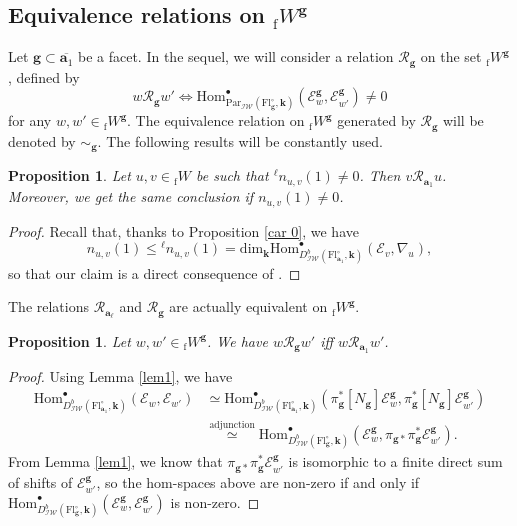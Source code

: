 \documentclass[11pt]{amsart}
\theoremstyle{plain}
\newtheorem{prop}[thm]{Proposition}
\theoremstyle{remark}
\numberwithin{equation}{section}
\begin{document}
	\subsection{Equivalence relations on ${_\mathrm{f}W}^\mathbf{g}$}
	Let $\mathbf{g}\subset\overline{\mathbf{a}_1}$ be a facet.  In the sequel, we will consider a relation $\mathscr{R}_{\mathbf{g}}$ on the set ${_\mathrm{f}W}^{\mathbf{g}}$, defined by 
	$$w\mathscr{R}_{\mathbf{g}}w'\Longleftrightarrow \mathrm{Hom}^\bullet_{\mathrm{Par}_{\mathcal{IW}}(\mathrm{Fl}^{\circ}_{\mathbf{g}},\mathbf{k})}(\mathcal{E}^{\mathbf{g}}_{w},\mathcal{E}^{\mathbf{g}}_{w'})\neq 0$$ 
	for any $w,w'\in {_\mathrm{f}W}^{\mathbf{g}}$. The equivalence relation on ${_\mathrm{f}W}^{\mathbf{g}}$ generated by $\mathscr{R}_{\mathbf{g}}$ will be denoted by $\sim_{\mathbf{g}}$. The following results will be constantly used.
	\begin{prop}\label{anti-spherical relations}
		Let $u,v\in{_\mathrm{f}W}$ be such that ${^\ell n}_{u,v}(1)\neq 0$. Then $v\mathscr{R}_{\mathbf{a}_1} u$. Moreover, we get the same conclusion if ${n}_{u,v}(1)\neq 0$.
	\end{prop}
	\begin{proof}
		Recall that, thanks to Proposition \ref{car 0}, we have
		$$n_{u,v}(1)\leq {^\ell n}_{u,v}(1)=\mathrm{dim}_\mathbf{k}\mathrm{Hom}_{D^b_{\mathcal{IW}}(\mathrm{Fl}^{\circ}_{\mathbf{a}_1},\mathbf{k})}^\bullet(\mathcal{E}_v,\nabla_{u}),$$
		so that our claim is a direct consequence of \cite[Proposition 2.6]{2014}.
	\end{proof}
	The relations $\mathscr{R}_{\mathbf{a}_\ell}$ and $\mathscr{R}_{\mathbf{g}}$ are actually equivalent on ${_\mathrm{f}W}^{\mathbf{g}}$.
	\begin{prop}\label{proj form}
		Let $w,w'\in {_\mathrm{f}W}^{\mathbf{g}}$. We have $w\mathscr{R}_{\mathbf{g}}w'$ iff $w\mathscr{R}_{\mathbf{a}_1}w'$.
	\end{prop}
	\begin{proof}
		Using Lemma \ref{lem1}, we have
		\begin{align*}
			\mathrm{Hom}_{D^b_{\mathcal{IW}}(\mathrm{Fl}^{\circ}_{\mathbf{a}_1},\mathbf{k})}^\bullet(\mathcal{E}_w,\mathcal{E}_{w'})&\simeq \mathrm{Hom}_{D^b_{\mathcal{IW}}(\mathrm{Fl}^{\circ}_{\mathbf{a}_1},\mathbf{k})}^\bullet(\pi^*_{\mathbf{g}}[N_\mathbf{g}]\mathcal{E}_w^{\mathbf{g}},\pi^*_{\mathbf{g}}[N_\mathbf{g}]\mathcal{E}_{w'}^{\mathbf{g}})\\
			&\overset{\text{adjunction}}{\simeq} \mathrm{Hom}_{D^b_{\mathcal{IW}}(\mathrm{Fl}^{\circ}_{\mathbf{g}},\mathbf{k})}^\bullet(\mathcal{E}_w^{\mathbf{g}},\pi_{\mathbf{g}*}\pi_{\mathbf{g}}^*\mathcal{E}_{w'}^{\mathbf{g}}).
		\end{align*}
		From Lemma \ref{lem1}, we know that $\pi_{\mathbf{g}*}\pi_{\mathbf{g}}^*\mathcal{E}_{w'}^{\mathbf{g}}$ is isomorphic to a finite direct sum of shifts of $\mathcal{E}_{w'}^{\mathbf{g}}$,
		so the hom-spaces above are non-zero if and only if $\mathrm{Hom}_{D^b_{\mathcal{IW}}(\mathrm{Fl}^{\circ}_{\mathbf{g}},\mathbf{k})}^\bullet(\mathcal{E}_w^{\mathbf{g}},\mathcal{E}_{w'}^{\mathbf{g}})$ is non-zero.
	\end{proof}
\end{document}
